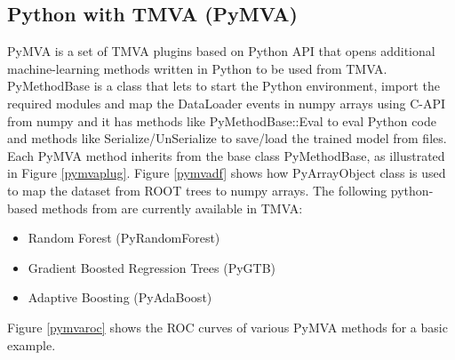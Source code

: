 \documentclass[a4paper]{jpconf}
\begin{document}
\clearpage
\subsection{Python with TMVA (PyMVA)} \label{PYMVA}
PyMVA is a set of TMVA plugins based on Python API that opens additional machine-learning methods written in Python to be used from TMVA. 
PyMethodBase is a class that lets to start the Python environment, import the required modules and map the DataLoader events in numpy arrays using C-API from numpy and it has 
methods like PyMethodBase::Eval to eval Python code and methods like Serialize/UnSerialize to save/load the trained model from files.
Each PyMVA method inherits from the base class PyMethodBase, as illustrated in Figure \ref{pymvaplug}. 
Figure \ref{pymvadf} shows how PyArrayObject class is used to map the dataset from ROOT trees to numpy arrays. The following python-based methods from \cite{pedregosa2011scikit} are currently available in TMVA:


\begin{itemize}
\item Random Forest (PyRandomForest)
\item Gradient Boosted Regression Trees (PyGTB) 
\item Adaptive Boosting (PyAdaBoost) 
\end{itemize}
Figure \ref{pymvaroc} shows the ROC curves of various PyMVA methods for a basic example.
\end{document}
